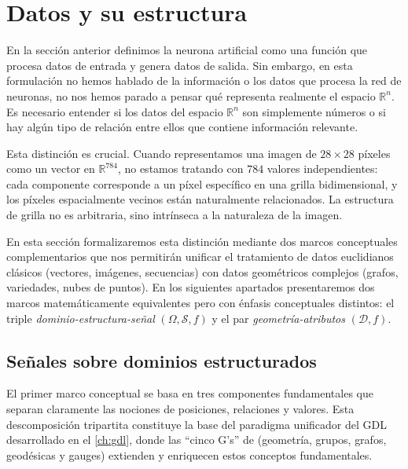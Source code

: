 \section{Datos y su estructura}\label{sec:datos_estructura}

En la sección anterior definimos la neurona artificial como una función que procesa datos de entrada y genera datos de salida. Sin embargo, en esta formulación no hemos hablado de la información o los datos que procesa la red de neuronas, no nos hemos parado a pensar qué representa realmente el espacio $\mathbb{R}^n$. Es necesario entender si los datos del espacio $\mathbb{R}^n$ son simplemente números o si hay algún tipo de relación entre ellos que contiene información relevante.

Esta distinción es crucial. Cuando representamos una imagen de $28 \times 28$ píxeles como un vector en $\mathbb{R}^{784}$, no estamos tratando con $784$ valores independientes: cada componente corresponde a un píxel específico en una grilla bidimensional, y los píxeles espacialmente vecinos están naturalmente relacionados. La estructura de grilla no es arbitraria, sino intrínseca a la naturaleza de la imagen.

En esta sección formalizaremos esta distinción mediante dos marcos conceptuales complementarios que nos permitirán unificar el tratamiento de datos euclidianos clásicos (vectores, imágenes, secuencias) con datos geométricos complejos (grafos, variedades, nubes de puntos). En los siguientes apartados presentaremos dos marcos matemáticamente equivalentes pero con énfasis conceptuales distintos: el triple \textit{dominio-estructura-señal} $(\Omega, \mathcal{S}, f)$ y el par \textit{geometría-atributos} $(\mathcal{D}, f)$.

\subsection{Señales sobre dominios estructurados}\label{sec:senales_dominios}

El primer marco conceptual se basa en tres componentes fundamentales que separan claramente las nociones de posiciones, relaciones y valores. Esta descomposición tripartita constituye la base del paradigma unificador del \gls{GDL} desarrollado en el \autoref{ch:gdl}, donde las ``cinco G's'' de \citet{bronstein2017geometricdeeplearning} (geometría, grupos, grafos, geodésicas y gauges) extienden y enriquecen estos conceptos fundamentales.

